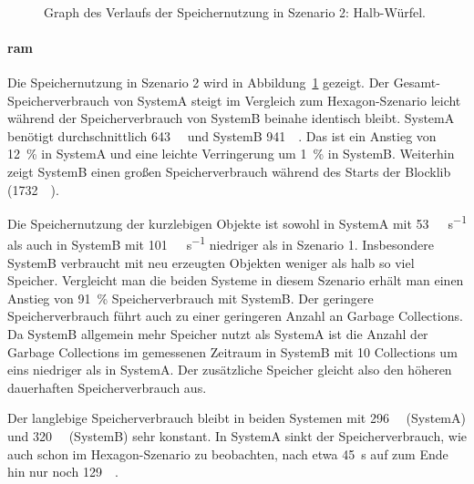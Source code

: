 \begin{figure}[!htb]
	\\
	\caption{Graph des Verlaufs der Speichernutzung in Szenario 2: Halb-Würfel.}\label{fig:seed-0-cube-mem}
\end{figure} 
\paragraph{\ac{ram}} Die Speichernutzung in Szenario 2 wird in Abbildung~\ref{fig:seed-0-cube-mem} gezeigt. Der Ge\-samt-Spei\-cher\-ver\-brauch von SystemA steigt im Vergleich zum Hexagon-Szenario leicht während der Speicherverbrauch von SystemB beinahe identisch bleibt. SystemA benötigt durchschnittlich \SI{643}{\mega\byte} und SystemB \SI{941}{\mega\byte}. Das ist ein Anstieg von \SI{12}{\percent} in SystemA und eine leichte Verringerung um \SI{1}{\percent} in SystemB. Weiterhin zeigt SystemB einen großen Speicherverbrauch während des Starts der Blocklib (\SI{1732}{\mega\byte}).

Die Speichernutzung der kurzlebigen Objekte ist sowohl in SystemA mit \SI{53}{\mega\byte\per\second} als auch in SystemB mit \SI{101}{\mega\byte\per\second} niedriger als in Szenario 1. Insbesondere SystemB verbraucht mit neu erzeugten Objekten weniger als halb so viel Speicher. Vergleicht man die beiden Systeme in diesem Szenario erhält man einen Anstieg von \SI{91}{\percent} Speicherverbrauch mit SystemB. Der geringere Speicherverbrauch führt auch zu einer geringeren Anzahl an Garbage Collections. Da SystemB allgemein mehr Speicher nutzt als SystemA ist die Anzahl der Garbage Collections im gemessenen Zeitraum in SystemB mit 10 Collections um eins niedriger als in SystemA. Der zusätzliche Speicher gleicht also den höheren dauerhaften Speicherverbrauch aus. 

Der langlebige Speicherverbrauch bleibt in beiden Systemen mit \SI{296}{\mega\byte} (SystemA) und \SI{320}{\mega\byte} (SystemB) sehr konstant. In SystemA sinkt der Speicherverbrauch, wie auch schon im Hexagon-Szenario zu beobachten, nach etwa \SI{45}{\second} auf zum Ende hin nur noch \SI{129}{\mega\byte}.